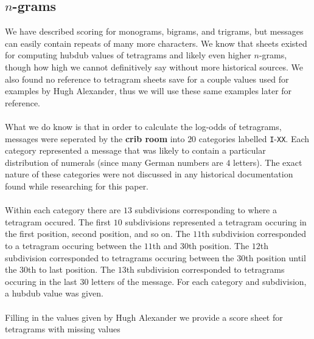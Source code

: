 \subsection{$n$-grams}
We have described scoring for monograms, bigrams, and trigrams, but
messages can easily contain repeats of many more characters. We
know that sheets existed for computing hubdub values of tetragrams
and likely even higher $n$-grams, though how high we cannot
definitively say without more historical sources. We also found no
reference to tetragram sheets save for a couple values used for
examples by Hugh Alexander, thus we will use these same examples
later for reference.
\\\\What we do know is that in order to calculate the log-odds of
tetragrams, messages were seperated by the {\bf{crib room}} into
$20$ categories labelled \texttt{I}-\texttt{XX}. Each category
represented a message that was likely to contain a particular
distribution of numerals (since many German numbers are $4$
letters). The exact nature of these categories were not discussed
in any historical documentation found while researching for this paper.
\\\\Within each category there are $13$ subdivisions corresponding
to where a tetragram occured. The first $10$ subdivisions
represented a tetragram occuring in the first position, second
position, and so on. The $11$th subdivision corresponded to a
tetragram occuring between the $11$th and $30$th position. The
$12$th subdivision corresponded to tetragrams occuring between the
$30$th position until the $30$th to last position. The $13$th
subdivision corresponded to tetragrams occuring in the last $30$
letters of the message. For each category and subdivision, a hubdub
value was given.
\\\\Filling in the values given by Hugh Alexander we provide a
score sheet for tetragrams with missing values
